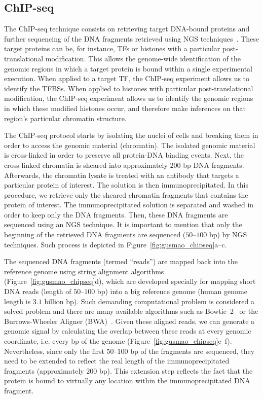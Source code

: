 \subsection{ChIP-seq}
\label{sec:chip.seq}

The ChIP-seq technique consists on retrieving target DNA-bound proteins and further sequencing of the DNA fragments retrieved using NGS techniques~\citep{johnson2007}. These target proteins can be, for instance, TFs or histones with a particular post-translational modification. This allows the genome-wide identification of the genomic regions in which a target protein is bound within a single experimental execution. When applied to a target TF, the ChIP-seq experiment allows us to identify the TFBSs. When applied to histones with particular post-translational modification, the ChIP-seq experiment allows us to identify the genomic regions in which these modified histones occur, and therefore make inferences on that region's particular chromatin structure.

The ChIP-seq protocol starts by isolating the nuclei of cells and breaking them in order to access the genomic material (chromatin). The isolated genomic material is cross-linked in order to preserve all protein-DNA binding events. Next, the cross-linked chromatin is sheared into approximately $200$ bp DNA fragments. Afterwards, the chromatin lysate is treated with an antibody that targets a particular protein of interest. The solution is then immunoprecipitated. In this procedure, we retrieve only the sheared chromatin fragments that contains the protein of interest. The immunoprecipitated solution is separated and washed in order to keep only the DNA fragments. Then, these DNA fragments are sequenced using an NGS technique. It is important to mention that only the beginning of the retrieved DNA fragments are sequenced ($50$--$100$ bp) by NGS techniques. Such process is depicted in Figure~\ref{fig:gusmao_chipseq}a--c.

The sequenced DNA fragments (termed ``reads'') are mapped back into the reference genome using string alignment algorithms (Figure~\ref{fig:gusmao_chipseq}d), which are developed specially for mapping short DNA reads (length of $50$--$100$ bp) into a big reference genome (human genome length is \approxy$3.1$ billion bp). Such demanding computational problem is considered a solved problem and there are many available algorithms such as Bowtie~2~\citep{langmead2012} or the Burrows-Wheeler Aligner (BWA)~\citep{li2009b}. Given these aligned reads, we can generate a genomic signal by calculating the overlap between these reads at every genomic coordinate, i.e. every bp of the genome (Figure~\ref{fig:gusmao_chipseq}e--f). Nevertheless, since only the first $50$--$100$ bp of the fragments are sequenced, they need to be extended to reflect the real length of the immunoprecipitated fragments (approximately $200$ bp). This extension step reflects the fact that the protein is bound to virtually any location within the immunoprecipitated DNA fragment.

